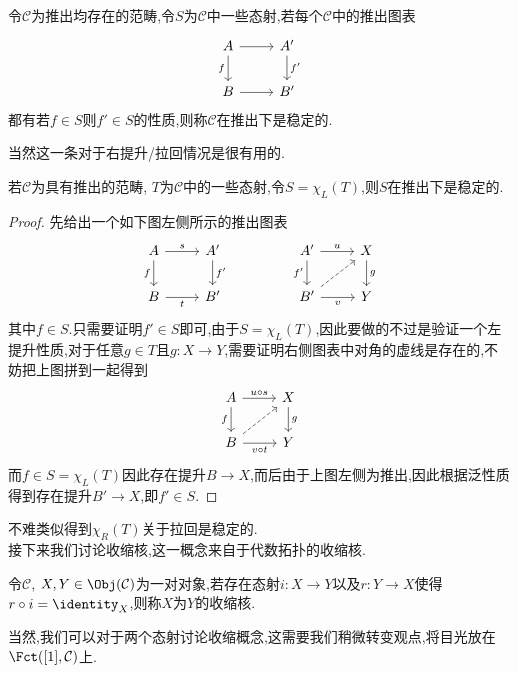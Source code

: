 \begin{definition}
    令$\mathcal{C}$为推出均存在的范畴,令$S$为$\mathcal{C}$中一些态射,若每个$\mathcal{C}$中的推出图表
    \[\begin{tikzcd}
	A & {A'} \\
	B & {B'}
	\arrow[from=1-1, to=1-2]
	\arrow["f"', from=1-1, to=2-1]
	\arrow["{f'}", from=1-2, to=2-2]
	\arrow[from=2-1, to=2-2]
    \end{tikzcd}\]
    都有若$f\in S$则$f'\in S$的性质,则称$\mathcal{C}$在推出下是稳定的.
\end{definition}
当然这一条对于右提升/拉回情况是很有用的.
\begin{proposition}\label{命题:推出下稳定}
    若$\mathcal{C}$为具有推出的范畴, $T$为$\mathcal{C}$中的一些态射,令$S = \chi_L(T)$,则$S$在推出下是稳定的.
\end{proposition}
\begin{proof}
    先给出一个如下图左侧所示的推出图表
    \[\begin{tikzcd}
	A & {A'} && {A'} & X \\
	B & {B'} && {B'} & Y
	\arrow["s", from=1-1, to=1-2]
	\arrow["f"', from=1-1, to=2-1]
	\arrow["{f'}", from=1-2, to=2-2]
	\arrow["u", from=1-4, to=1-5]
	\arrow["{f'}"', from=1-4, to=2-4]
	\arrow["g", from=1-5, to=2-5]
	\arrow["t"', from=2-1, to=2-2]
	\arrow[dashed, from=2-4, to=1-5]
	\arrow["v"', from=2-4, to=2-5]
    \end{tikzcd}\]
    其中$f\in S$.只需要证明$f'\in S$即可,由于$S = \chi_L(T)$,因此要做的不过是验证一个左提升性质,对于任意$g\in T$且$g:X \to Y$,需要证明右侧图表中对角的虚线是存在的,不妨把上图拼到一起得到
    \[\begin{tikzcd}
	A & X \\
	B & Y
	\arrow["{u\circ s}", from=1-1, to=1-2]
	\arrow["f"', from=1-1, to=2-1]
	\arrow["g", from=1-2, to=2-2]
	\arrow[dashed, from=2-1, to=1-2]
	\arrow["{v\circ t}"', from=2-1, to=2-2]
    \end{tikzcd}\]
    而$f\in S = \chi_L(T)$因此存在提升$B \to X$,而后由于上图左侧为推出,因此根据泛性质得到存在提升$B' \to X$,即$f'\in S$.
\end{proof}
不难类似得到$\chi_R(T)$关于拉回是稳定的.\\
接下来我们讨论收缩核,这一概念来自于代数拓扑的收缩核.
\begin{definition}[收缩核]
    令$\mathcal{C}$, $X,Y\in \Obj (\mathcal{C})$为一对对象,若存在态射$i : X\to Y$以及$r: Y\to X$使得$r\circ i = \identity_{X}$,则称$X$为$Y$的收缩核.
\end{definition}
当然,我们可以对于两个态射讨论收缩概念,这需要我们稍微转变观点,将目光放在$\Fct([1],\mathcal{C})$上.
